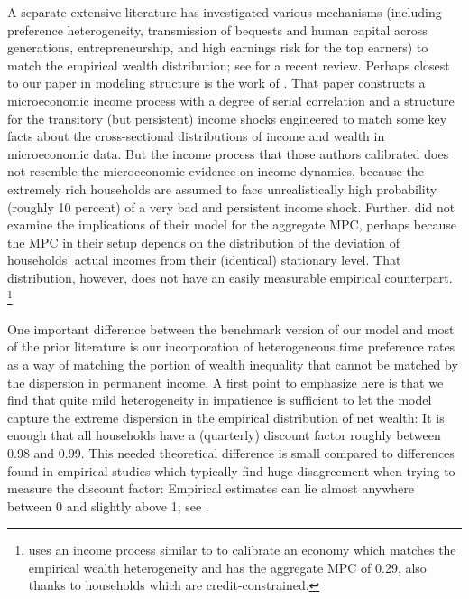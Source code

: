 \documentclass[12pt,titlepage]{econtex}
\begin{document}
A separate extensive literature has investigated various mechanisms (including preference heterogeneity, transmission of bequests and human
capital across generations, entrepreneurship, and high earnings risk for the top earners) to match the empirical wealth distribution; see \cite{deNardi2015} for a recent review.
Perhaps closest to our paper in modeling structure is the work of
\cite{castaneda}.  That paper constructs a microeconomic income
process with a degree of serial correlation and a structure for the
transitory (but persistent) income shocks engineered to match
some key facts about the cross-sectional distributions of income and
wealth in microeconomic data.  But the income process that those
authors calibrated does not resemble the microeconomic evidence on
income dynamics, because the extremely rich households are assumed to face
unrealistically high probability (roughly 10 percent) of a very bad and persistent income shock.
Further, \cite{castaneda} did not examine the implications of their model for the
aggregate MPC, perhaps because the  MPC in their setup depends on the distribution of
the deviation of households' actual incomes from their
(identical) stationary level. That distribution, however, does
not have an easily measurable empirical counterpart.%
\footnote{%
\cite{heathcote_fiscalPolicy} uses an income process similar to \cite{castaneda} to calibrate an economy which matches the empirical wealth heterogeneity and has the aggregate MPC of 0.29, also thanks to households which are credit-constrained.
}

One important difference between the benchmark version of our model and
most of the prior literature is our incorporation of heterogeneous
time preference rates as a way of matching the portion of wealth
inequality that cannot be matched by the dispersion in permanent
 income.  A first point to emphasize here is that we find that quite mild
heterogeneity in impatience is sufficient to let the
model capture the extreme dispersion in the empirical distribution of
net wealth: It is
enough that all households have a (quarterly) discount factor roughly
between 0.98 and 0.99.  This needed theoretical difference is small compared to differences found in empirical studies which typically find huge disagreement when trying to measure the discount factor: Empirical estimates can lie almost anywhere between 0 and
slightly above 1; see
\cite{frederickLoewensteinODonogue:discountReview}.
\end{document}
